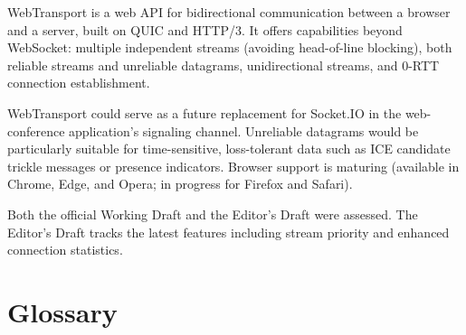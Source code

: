 \documentclass[11pt,letterpaper]{article}
\begin{document}
\vspace{0.5em}
WebTransport is a web API for bidirectional communication between a browser and a server, built on QUIC and HTTP/3. It offers capabilities beyond WebSocket: multiple independent streams (avoiding head-of-line blocking), both reliable streams and unreliable datagrams, unidirectional streams, and 0-RTT connection establishment.

WebTransport could serve as a future replacement for Socket.IO in the web-conference application's signaling channel. Unreliable datagrams would be particularly suitable for time-sensitive, loss-tolerant data such as ICE candidate trickle messages or presence indicators. Browser support is maturing (available in Chrome, Edge, and Opera; in progress for Firefox and Safari).

Both the official Working Draft and the Editor's Draft were assessed. The Editor's Draft tracks the latest features including stream priority and enhanced connection statistics.

\newpage

\section{Glossary}
\label{app:glossary}
\end{document}
